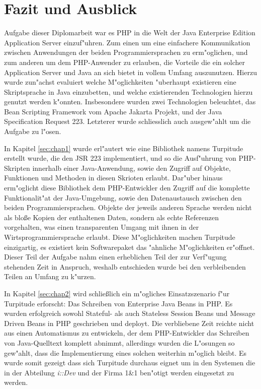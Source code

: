 \chapter{Fazit und Ausblick}
\label{sec:extro}

Aufgabe dieser Diplomarbeit war es PHP in die Welt der Java Enterprise Edition Application Server
einzuf"uhren. Zum einen um eine einfachere Kommunikation zwischen Anwendungen der beiden Programmiersprachen
zu erm"oglichen, und zum anderen um dem PHP-Anwender zu erlauben, die Vorteile die ein solcher Application Server
und Java an sich bietet in vollem Umfang auszunutzen. Hierzu wurde zun"achst evaluiert welche M"oglichkeiten
"uberhaupt existieren eine Skriptsprache in Java einzubetten, und welche existierenden Technologien hierzu
genutzt werden k"onnten. Insbesondere wurden zwei Technologien beleuchtet, das Bean Scripting Framework
vom Apache Jakarta Projekt, und der Java Specification Request 223. Letzterer wurde schliesslich auch 
ausgew"ahlt um die Aufgabe zu l"osen.

In Kapitel \ref{sec:chap1} wurde erl"autert wie eine Bibliothek namens Turpitude erstellt wurde, die den JSR 223 implementiert,
und so die Ausf"uhrung von PHP-Skripten innerhalb einer Java-Anwendung, sowie den Zugriff auf Objekte, Funktionen
und Methoden in diesen Skrioten erlaubt. Dar"uber hinaus erm"oglicht diese Bibliothek dem PHP-Entwickler den
Zugriff auf die komplette Funktionalit"at der Java-Umgebung, sowie den Datenaustausch zwischen den beiden
Programmiersprachen. Objekte der jeweils anderen Sprache werden nicht als blo\ss e Kopien der enthaltenen Daten,
sondern als echte Referenzen vorgehalten, was einen transparenten Umgang mit ihnen in der Wirtsprogrammiersprache
erlaubt. Diese M"oglichkeiten machen Turpitude einzigartig, es existiert kein Softwarepaket das "ahnliche
M"oglichkeiten er"offnet. Dieser Teil der Aufgabe nahm einen erheblichen Teil der zur Verf"ugung stehenden
Zeit in Anspruch, weshalb entschieden wurde bei den verbleibenden Teilen an Umfang zu k"urzen.

In Kapitel \ref{sec:chap2} wird schlie\ss lich ein m"ogliches Einsatzszenario f"ur Turpitude erforscht: Das Schreiben von
Enterprise Java Beans in PHP. Es wurden erfolgreich sowohl Stateful- als auch Stateless Session Beans und Message Driven Beans
in PHP geschrieben und deployt. Die verbliebene Zeit reichte nicht aus einen Automatismus zu entwickeln, der
dem PHP-Entwickler das Schreiben von Java-Quelltext komplett abnimmt, allerdings wurden die L"osungen so gew"ahlt, dass
die Implementierung eines solchen weiterhin m"oglich bleibt. Es wurde somit gezeigt dass sich Turpitude durchaus eignet
um in den Systemen die in der Abteilung \emph{i::Dev} und der Firma 1\&1 ben"otigt werden eingesetzt zu werden.

